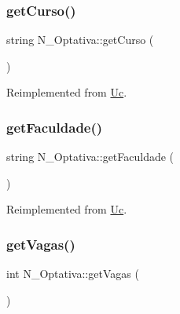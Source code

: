 \hypertarget{class_n___optativa_a94546c2209c4ff22d055084dc77477cd}{}\label{class_n___optativa_a94546c2209c4ff22d055084dc77477cd} 
\subsubsection{\texorpdfstring{get\+Curso()}{getCurso()}}
{\footnotesize\ttfamily string N\+\_\+\+Optativa\+::get\+Curso (\begin{DoxyParamCaption}{ }\end{DoxyParamCaption})\hspace{0.3cm}{\ttfamily [virtual]}}



Reimplemented from \hyperlink{class_uc_a30c8b684d775a3d8304fcafefea2b951}{Uc}.

\hypertarget{class_n___optativa_a596634b068f013adb820683ff1f50566}{}\label{class_n___optativa_a596634b068f013adb820683ff1f50566} 
\subsubsection{\texorpdfstring{get\+Faculdade()}{getFaculdade()}}
{\footnotesize\ttfamily string N\+\_\+\+Optativa\+::get\+Faculdade (\begin{DoxyParamCaption}{ }\end{DoxyParamCaption})\hspace{0.3cm}{\ttfamily [virtual]}}



Reimplemented from \hyperlink{class_uc_a5820a4fc8672679329f72467aa1599da}{Uc}.

\hypertarget{class_n___optativa_a8eb826eecb5447077d8906eb5a687193}{}\label{class_n___optativa_a8eb826eecb5447077d8906eb5a687193} 
\subsubsection{\texorpdfstring{get\+Vagas()}{getVagas()}}
{\footnotesize\ttfamily int N\+\_\+\+Optativa\+::get\+Vagas (\begin{DoxyParamCaption}{ }\end{DoxyParamCaption})\hspace{0.3cm}{\ttfamily [virtual]}}



